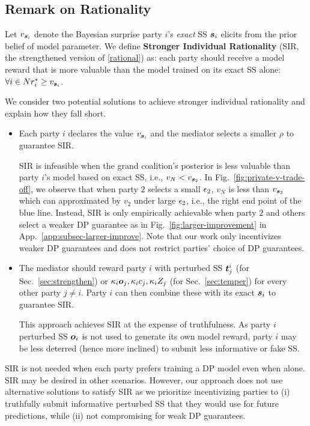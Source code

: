 \documentclass{article}
\theoremstyle{plain}
\theoremstyle{definition}
\theoremstyle{remark}
\begin{document}
\subsection{Remark on Rationality}\label{app:rationality}

Let $v_{{\bm{s}}_i}$ denote the Bayesian surprise party $i$'s \emph{exact} SS ${\bm{s}}_i$ elicits from the prior belief of model parameter.
We define \textbf{Stronger Individual Rationality} (SIR, the strengthened version of \ref{rational}) as: each party should receive a model reward that is more valuable than the model trained on its exact SS alone: $\forall i \in N r_i^* \geq v_{{\bm{s}}_i}$.

We consider two potential solutions to achieve stronger individual rationality and explain how they fall short.
\begin{itemize}[noitemsep]
    \item Each party $i$ declares the value $v_{{\bm{s}}_i}$ and the mediator selects a smaller $\rho$ to guarantee SIR.

    SIR is infeasible when the grand coalition's posterior is less valuable than party $i$'s model based on exact SS, i.e., $v_N < v_{{\bm{s}}_2}$. In Fig.~\ref{fig:private-v-trade-off}, we observe that when party $2$ selects a small ${\epsilon}_2$, $v_N$ is less than $v_{{\bm{s}}_2}$ which can approximated by $v_2$ under large ${\epsilon}_2$, i.e., the right end point of the blue line. Instead, SIR is only empirically achievable when party $2$ and others select a weaker DP guarantee as in Fig.~\ref{fig:larger-improvement} in App.~\ref{app:subsec-larger-improve}. Note that our work only incentivizes weaker DP guarantees and does not restrict parties' choice of DP guarantees.

    \item The mediator should reward party $i$ with perturbed SS ${\bm{t}}_j^i$ (for Sec.~\ref{sec:strengthen})  or ${\kappa_i} {\bm{o}}_j, {\kappa_i} c_j, {\kappa_i} Z_j$ (for Sec.~\ref{sec:temper}) for every other party $j \neq i$. Party $i$ can then combine these with its exact ${\bm{s}}_i$ to guarantee SIR. 
    
    This approach achieves SIR at the expense of truthfulness. As party $i$ perturbed SS ${\bm{o}}_i$ is not used to generate its own model reward, party $i$ may be less deterred (hence more inclined) to submit less informative or fake SS.

\end{itemize}

SIR is not needed when each party prefers training a DP model even when alone. 
SIR may be desired in other scenarios. However, our approach does not use alternative solutions to satisfy SIR as we prioritize incentivizing parties to (i) truthfully submit informative perturbed SS that they would use for future predictions, while (ii) not compromising for weak DP guarantees.
\end{document}
